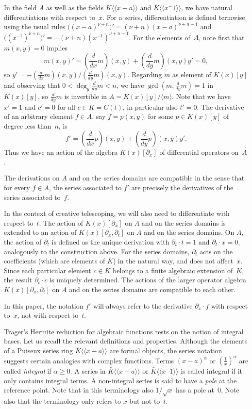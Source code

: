 \documentclass{sig-alternate-05-2015}
\def\<#1>{\langle\!\langle#1\rangle\!\rangle} %
\begin{document}
In the field $A$ as well as the fields $\bar K\<x-a>$ and $\bar K\<x^{-1}>$, we have
natural differentiations with respect to~$x$. For a series, differentiation is defined
termwise using the usual rules $\bigl((x-a)^{\nu+n}\bigr)'=(\nu+n)(x-a)^{\nu+n-1}$ and
$\bigl((x^{-1})^{\nu+n}\bigr)'=-(\nu+n)(x^{-1})^{\nu+n+1}$. For the elements of~$A$, note
first that $m(x,y)=0$ implies
\begin{equation}\label{eq:yprime}
  m(x,y)'=(\frac d{dx}m)(x,y) + (\frac d{dy}m)(x,y)y' = 0,
\end{equation}
so $y'=-(\frac d{dx}m)(x,y)/(\frac d{dy}m)(x,y)$. Regarding $m$ as element of $K(x)[y]$
and observing that $0<\deg_y\frac d{dy}m<n$, we have $\gcd(m,\frac d{dy}m)=1$ in $K(x)[y]$,
so $\frac{d}{dy}m$ is invertible in $A=K(x)[y]/\langle m\rangle$.
Note that we have $x'=1$ and $c'=0$ for all $c\in K=C(t)$, in particular also $t'=0$.
The derivative of an arbitrary
element $f\in A$, say $f=p(x,y)$ for some $p\in K(x)[y]$ of degree less than~$n$, is
\[f'=(\frac{d}{dx}p)(x,y)+(\frac d{dy}p)(x,y)y'.\]
Thus we have an action of the algebra $K(x)[\partial_x]$ of differential operators on~$A$.

The derivations on $A$ and on the series domains are compatible in the sense
that for every $f\in A$, the series associated to $f'$ are precisely the
derivatives of the series associated to~$f$.

In the context of creative telescoping, we will also need to differentiate with
respect to~$t$. The action of $K(x)[\partial_x]$ on $A$ and on the series domains
is extended to an action of $K(x)[\partial_x,\partial_t]$ on $A$ and on the series
domains. On $A$, the action of $\partial_t$ is defined as the unique derivation with
$\partial_t\cdot t=1$ and $\partial_t\cdot x=0$, analogously to the construction
above. For the series domains, $\partial_t$ acts on the coefficients
(which are elements of $\bar K$) in the natural way, and does not affect~$x$.
Since each particular element $c\in\bar K$ belongs to a finite algebraic extension of~$K$,
the result $\partial_t\cdot c$ is uniquely determined.
The actions of the larger operator algebra
$K(x)[\partial_x,\partial_t]$ on $A$ and on the series domains are compatible to
each other.

In this paper, the notation $f'$ will always refer to the derivative $\partial_x\cdot f$
with respect to~$x$, not with respect to~$t$.

\medskip

Trager's Hermite reduction for algebraic functions rests on the notion of
integral bases. Let us recall the relevant definitions and properties.
Although the elements of a Puiseux series ring $\bar K\<x-a>$ are formal
objects, the series notation suggests certain analogies with complex
functions. Terms $(x-a)^\alpha$ or $(\tfrac1x)^\alpha$ are
called \emph{integral} if $\alpha\geq0$. A series in
$\bar K\<x-a>$ or $\bar K\<x^{-1}>$ is called integral if it only contains integral
terms. A non-integral series is said to have a \emph{pole} at the reference
point. Note that in this terminology also $1/\sqrt{x}$ has a pole
at~$0$. Note also that the terminology only refers to $x$ but not to~$t$.
\end{document}
